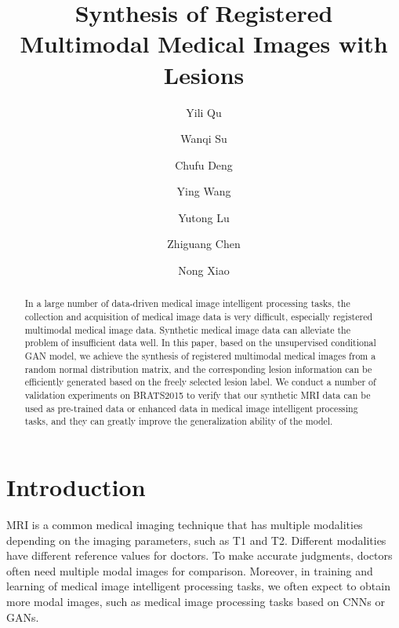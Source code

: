 \documentclass[runningheads]{llncs}
\begin{document}
%
\title{Synthesis of Registered Multimodal
		Medical Images with Lesions}
%
\author{ Yili Qu \and Wanqi Su \and Chufu Deng \and Ying Wang \\
	\and Yutong Lu \and Zhiguang Chen \and Nong Xiao}
%
%
%
\maketitle              %
%
\begin{abstract}
In a large number of data-driven medical image intelligent processing tasks, the collection and acquisition of medical image data is very difficult, especially registered multimodal medical image data. Synthetic medical image data can alleviate the problem of insufficient data well. In this paper, based on the unsupervised conditional GAN model, we achieve the synthesis of registered multimodal medical images from a random normal distribution matrix, and the corresponding lesion information can be efficiently generated based on the freely selected lesion label. We conduct a number of validation experiments on BRATS2015 to verify that our synthetic MRI data can be used as pre-trained data or enhanced data in medical image intelligent processing tasks, and they can greatly improve the generalization ability of the model.

\end{abstract}
%
%
%
\section{Introduction}
MRI is a common medical imaging technique that has multiple modalities depending on the imaging parameters, such as T1 and T2. Different modalities have different reference values for doctors. To make accurate judgments, doctors often need multiple modal images for comparison. Moreover, in training and learning of medical image intelligent processing tasks, we often expect to obtain more modal images, such as medical image processing tasks based on CNNs\cite{86krizhevsky2012imagenet} or GANs\cite{25goodfellow2014generative}. 
\end{document}
